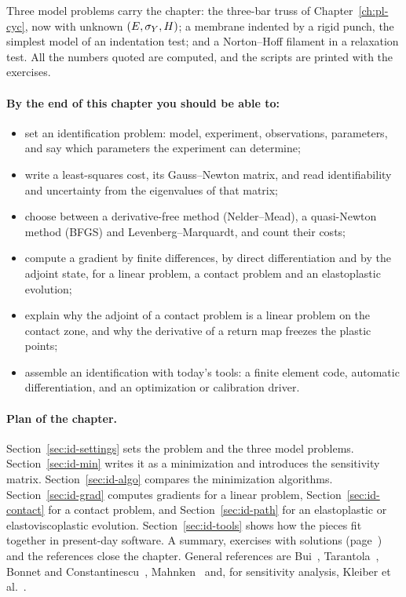Three model problems carry the chapter: the three-bar truss of
Chapter~\ref{ch:pl-cyc}, now with unknown $(E,\sigma_{Y},H)$; a membrane indented by
a rigid punch, the simplest model of an indentation test; and a Norton--Hoff
filament in a relaxation test. All the numbers quoted are computed, and the
scripts are printed with the exercises.

\paragraph{By the end of this chapter you should be able to:}
\begin{itemize}
  \item set an identification problem: model, experiment, observations,
  parameters, and say which parameters the experiment can determine;
  \item write a least-squares cost, its Gauss--Newton matrix, and read
  identifiability and uncertainty from the eigenvalues of that matrix;
  \item choose between a derivative-free method (Nelder--Mead), a quasi-Newton
  method (BFGS) and Levenberg--Marquardt, and count their costs;
  \item compute a gradient by finite differences, by direct differentiation and
  by the adjoint state, for a linear problem, a contact problem and an
  elastoplastic evolution;
  \item explain why the adjoint of a contact problem is a linear problem on the
  contact zone, and why the derivative of a return map freezes the plastic
  points;
  \item assemble an identification with today's tools: a finite element code,
  automatic differentiation, and an optimization or calibration driver.
\end{itemize}

\paragraph{Plan of the chapter.} Section~\ref{sec:id-settings} sets the
problem and the three model problems. Section~\ref{sec:id-min} writes it as a
minimization and introduces the sensitivity matrix.
Section~\ref{sec:id-algo} compares the minimization algorithms.
Section~\ref{sec:id-grad} computes gradients for a linear problem,
Section~\ref{sec:id-contact} for a contact problem, and
Section~\ref{sec:id-path} for an elastoplastic or elastoviscoplastic
evolution. Section~\ref{sec:id-tools} shows how the pieces fit together in
present-day software. A summary, exercises with solutions
(page~\pageref{sec:id-exo}) and the references close the chapter. General
references are Bui~\cite{Bui1993id}, Tarantola~\cite{Tarantola2005}, Bonnet and
Constantinescu~\cite{BonnetConstantinescu2005}, Mahnken~\cite{Mahnken2004}
and, for sensitivity analysis, Kleiber et al.~\cite{KleiberEtAl1997}.

